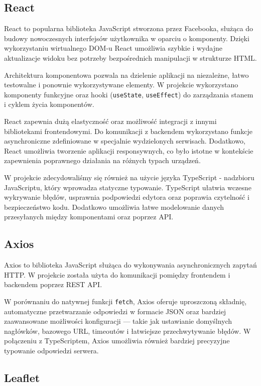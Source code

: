 \subsection{React}

React to popularna biblioteka JavaScript stworzona przez Facebooka, służąca do budowy nowoczesnych interfejsów użytkownika w oparciu o komponenty. Dzięki wykorzystaniu wirtualnego DOM-u React umożliwia szybkie i wydajne aktualizacje widoku bez potrzeby bezpośrednich manipulacji w strukturze HTML.

Architektura komponentowa pozwala na dzielenie aplikacji na niezależne, łatwo testowalne i ponownie wykorzystywane elementy. W projekcie wykorzystano komponenty funkcyjne oraz hooki (\texttt{useState}, \texttt{useEffect}) do zarządzania stanem i cyklem życia komponentów.

React zapewnia dużą elastyczność oraz możliwość integracji z innymi bibliotekami frontendowymi. Do komunikacji z backendem wykorzystano funkcje asynchroniczne zdefiniowane w specjalnie wydzielonych serwisach. Dodatkowo, React umożliwia tworzenie aplikacji responsywnych, co było istotne w kontekście zapewnienia poprawnego działania na różnych typach urządzeń.

W projekcie zdecydowaliśmy się również na użycie języka TypeScript - nadzbioru JavaScriptu, który wprowadza statyczne typowanie. TypeScript ułatwia wczesne wykrywanie błędów, usprawnia podpowiedzi edytora oraz poprawia czytelność i bezpieczeństwo kodu. Dodatkowo umożliwia łatwe modelowanie danych przesyłanych między komponentami oraz poprzez API.

\subsection{Axios}

Axios to biblioteka JavaScript służąca do wykonywania asynchronicznych zapytań HTTP. W projekcie została użyta do komunikacji pomiędzy frontendem i backendem poprzez REST API.

W porównaniu do natywnej funkcji \texttt{fetch}, Axios oferuje uproszczoną składnię, automatyczne przetwarzanie odpowiedzi w formacie JSON oraz bardziej zaawansowane możliwości konfiguracji — takie jak ustawianie domyślnych nagłówków, bazowego URL, timeoutów i łatwiejsze przechwytywanie błędów. W połączeniu z TypeScriptem, Axios umożliwia również bardziej precyzyjne typowanie odpowiedzi serwera.

\subsection{Leaflet}

